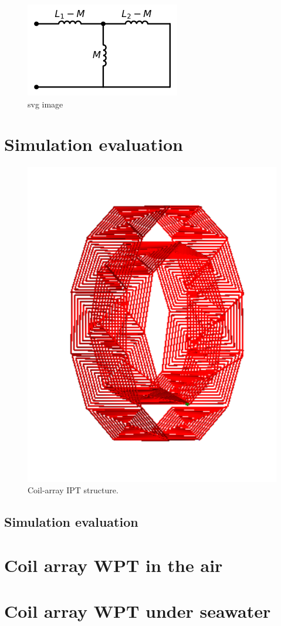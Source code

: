\begin{figure}[htbp]
    \centering
    \includegraphics{images/3_mutual_inductance.png}
    \caption{svg image}
\end{figure}

\section{Simulation evaluation}

\begin{figure}[htbp]
    \centering
    \includegraphics[width=0.5\linewidth]{images/4_coil_array_system.png}
    \caption{Coil-array IPT structure.}
\end{figure}



\subsection{Simulation evaluation}
\section{Coil array WPT in the air}

\section{Coil array WPT under seawater}